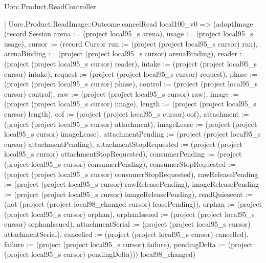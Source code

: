 \begin{lexlean}{Uorc.Product.ReadController}
\begin{semanticmodule}
{      | Uorc.Product.ReadImage::Outcome.cancelRead local100_v0 => (adoptImage (record Session {arena := (project local95_s arena), usage := (project local95_s usage), cursor := (record Cursor {run := (project (project local95_s cursor) run), arenaBinding := (project (project local95_s cursor) arenaBinding), reader := (project (project local95_s cursor) reader), intake := (project (project local95_s cursor) intake), request := (project (project local95_s cursor) request), phase := (project (project local95_s cursor) phase), control := (project (project local95_s cursor) control), raw := (project (project local95_s cursor) raw), image := (project (project local95_s cursor) image), length := (project (project local95_s cursor) length), eof := (project (project local95_s cursor) eof), attachment := (project (project local95_s cursor) attachment), imageLease := (project (project local95_s cursor) imageLease), attachmentPending := (project (project local95_s cursor) attachmentPending), attachmentStopRequested := (project (project local95_s cursor) attachmentStopRequested), consumerPending := (project (project local95_s cursor) consumerPending), consumerStopRequested := (project (project local95_s cursor) consumerStopRequested), rawReleasePending := (project (project local95_s cursor) rawReleasePending), imageReleasePending := (project (project local95_s cursor) imageReleasePending), readQuiescent := (not (project (project local98_changed cursor) leasePending)), orphan := (project (project local95_s cursor) orphan), orphanIssued := (project (project local95_s cursor) orphanIssued), attachmentSerial := (project (project local95_s cursor) attachmentSerial), cancelled := (project (project local95_s cursor) cancelled), failure := (project (project local95_s cursor) failure), pendingDelta := (project (project local95_s cursor) pendingDelta)})}) local98_changed)
}
\end{semanticmodule}
\end{lexlean}
